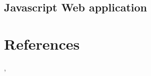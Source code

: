 \documentclass[12pt]{article}
\begin{document}
\subsection{Javascript Web application}

\section{References} \cite{videoTR}, \cite{ChronosTR}


\end{document}
